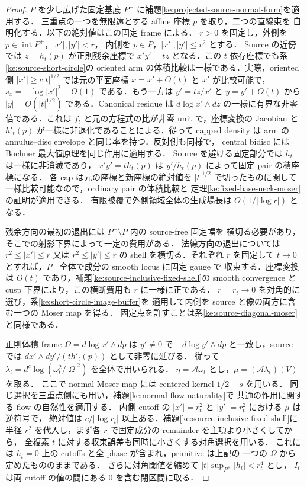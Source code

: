 \begin{proof}
$P$ を少し広げた固定基底 $P^+$ に補題\ref{ke:projected-source-normal-form}を適用する．
三重点の一つを無限遠とする affine 座標 $p$ を取り，二つの直線束を
自明化する．以下の絶対値はこの固定 frame による．
$r>0$ を固定し，外側を $p\in\operatorname{int}P^+$，$|x'|,|y'|<r$，
内側を $p\in P$，$|x'|,|y'|\le r^2$ とする．
Source の近傍では $z=h_t(p)$ が正則残余座標で
$x'y'=tz$ となる．この $t$ 依存座標でも系\ref{ke:source-short-circle}の
oriented arm の体積比較は一様である．実際，oriented 側
$|x'|\ge c|t|^{1/2}$ では元の平面座標 $x=x'+O(t)$ と $x'$ が比較可能で，
$s_x=-\log|x'|^2+O(1)$ である．もう一方は $y'=tz/x'$ と $y=y'+O(t)$
から $|y|=O(|t|^{1/2})$ である．Canonical residue は
$d\log x'\wedge dz$ の一様に有界な非零倍である．これは
$f_t$ と元の方程式の比が非零 unit で，座標変換の Jacobian と
$h'_t(p)$ が一様に非退化であることによる．従って capped density は
arm の annulus--disc envelope と同じ率を持つ．反対側も同様で，
central bidisc には Bochner 最大値原理を同じ作用に適用する．
Source を避ける固定部分では $h_t$ は一様に非消滅であり，
$x'y'=th_t(p)$ は $y'/h_t(p)$ によって固定 pair の積座標になる．
各 cap は元の座標と新座標の絶対値を $|t|^{1/2}$ で切ったものに関して
一様比較可能なので，ordinary pair の体積比較と
定理\ref{ke:fixed-base-neck-moser}の証明が適用できる．
有限被覆で外側領域全体の生成場長は $O(1/|\log r|)$ となる．

残余方向の最初の退出には $P^+\setminus P$ 内の source-free 固定幅を
横切る必要があり，そこでの射影下界によって一定の費用がある．
法線方向の退出については $r^2\le|x'|\le r$ 又は
$r^2\le|y'|\le r$ の shell を横切る．それぞれ $r$ を固定して
$t\to0$ とすれば，$P^+$ 全体で成分の smooth locus に固定 gauge で
収束する．座標変換は $O(t)$ であり，補題\ref{ke:source-inclusive-fixed-shell}の
smooth convergence と cusp 下界により，この横断費用も $r$ に一様に正である．
$ r=r_t\to0$ を対角的に選び，系\ref{ke:short-circle-image-buffer}を
適用して内側を source と像の両方に含む一つの Moser map を得る．
固定点を許すことは系\ref{ke:source-diagonal-moser}と同様である．

正則体積 frame $\Omega=d\log x'\wedge dp$ は $y'\ne0$ で
$-d\log y'\wedge dp$ と一致し，source では
$dx'\wedge dy'/(t h'_t(p))$ として非零に延びる．
従って $\lambda_t=d^c\log(\omega_t^2/|\Omega|^2)$ を全体で用いられる．
$\eta=\mathcal A\omega_t$ とし，$\mu=(\mathcal A\lambda_t)(V)$ を取る．
ここで normal Moser map には centered kernel $1/2-s$ を用いる．
同じ選択を三重点側にも用い，補題\ref{ke:normal-flow-naturality}で
共通の作用に関する flow の自然性を適用する．
内側 cutoff の $|x'|=r_t^2$ と $|y'|=r_t^2$ における $\mu$ は逆符号で，
絶対値は $c/|\log r_t|$ 以上ある．補題\ref{ke:source-inclusive-fixed-shell}に
半径 $r^2$ を代入し，まず各 $r$ で固定成分の remainder を主項より小さくしてから，
全複素 $t$ に対する収束誤差も同時に小さくする対角選択を用いる．
これには $h_t=0$ 上の cutoffs と全 phase が含まれ，primitive は上記の
一つの $\Omega$ から定めたもののままである．
さらに対角閾値を縮めて $|t|\sup_{P^+}|h_t|<r_t^4$ とし，
$I_t$ は両 cutoff の値の間にある $0$ を含む閉区間に取る．


\end{proof}
